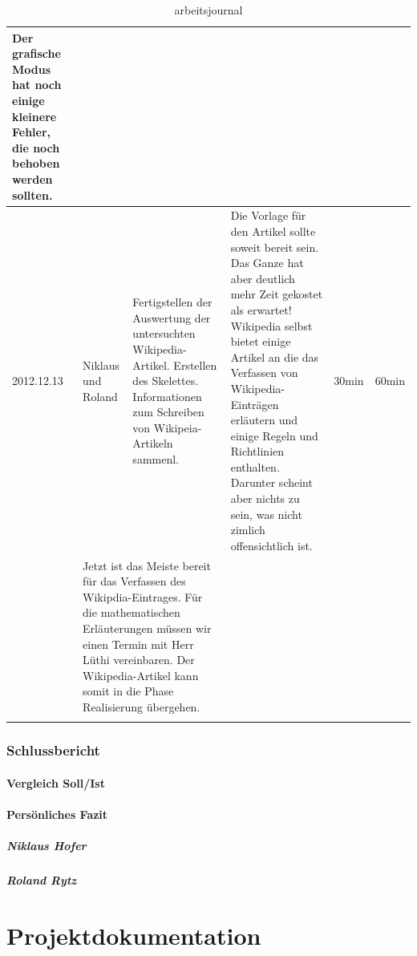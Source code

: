 \documentclass[11pt,paper=a4,final]{scrartcl}
\begin{document}
\begin{landscape}
\begin{longtable}{|p{1.8cm}|p{1.5cm}|p{5.0cm}|p{11.0cm}|l|l|}
{    Der grafische Modus hat noch einige kleinere Fehler, die noch behoben
    werden sollten.
    }  & \multicolumn{2}{l|}{} \\ \hline
    \hline
    2012.12.13 & Niklaus und Roland &
    Fertigstellen der Auswertung der untersuchten Wikipedia-Artikel. Erstellen
    des Skelettes. Informationen zum Schreiben von Wikipeia-Artikeln sammenl.&
    Die Vorlage f\"ur den Artikel sollte soweit bereit sein. Das Ganze hat aber
    deutlich mehr Zeit gekostet als erwartet! Wikipedia selbst bietet einige
    Artikel an die das Verfassen von Wikipedia-Eintr\"agen erl\"autern und
    einige Regeln und Richtlinien enthalten. Darunter scheint aber nichts zu
    sein, was nicht zimlich offensichtlich ist.
    &
    30min & 60min \\ \hline \nopagebreak
    \multicolumn{2}{|l|}{\bf Pendenzen} &\multicolumn{2}{p{16.0cm}|}{Jetzt ist
    das Meiste bereit f\"ur das Verfassen des Wikipdia-Eintrages. F\"ur die
    mathematischen Erl\"auterungen m\"ussen wir einen Termin mit Herr L\"uthi
    vereinbaren. Der Wikipedia-Artikel kann somit in die Phase Realisierung
    \"ubergehen.}  & \multicolumn{2}{l|}{} \\ \hline
  \caption{arbeitsjournal}
  \end{longtable}
\end{landscape}
\section{Schlussbericht}
\subsection{Vergleich Soll/Ist}
\subsection{Pers\"onliches Fazit}
\subsubsection{Niklaus Hofer}
\subsubsection{Roland Rytz}
\part{Projektdokumentation}
\end{document}
